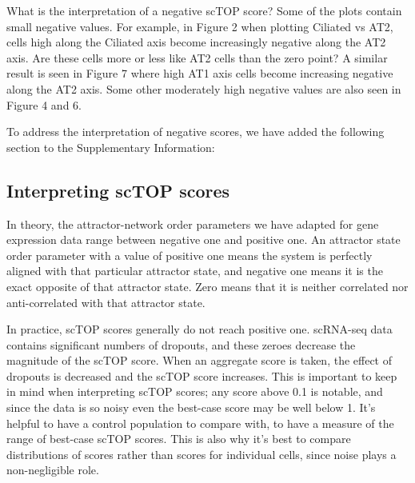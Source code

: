 \documentclass[12pt,american]{scrartcl}
\begin{document}
\begin{revcomment}
    What is the interpretation of a negative scTOP score? Some of the plots contain small negative values. For example, in Figure 2 when plotting Ciliated vs AT2, cells high along the Ciliated axis become increasingly negative along the AT2 axis. Are these cells more or less like AT2 cells than the zero point? A similar result is seen in Figure 7 where high AT1 axis cells become increasing negative along the AT2 axis. Some other moderately high negative values are also seen in Figure 4 and 6.
\end{revcomment}
\begin{revresponse}
    To address the interpretation of negative scores, we have added the following section to the Supplementary Information:
    \begin{changes}
        \subsection*{Interpreting scTOP scores}
        In theory, the attractor-network order parameters we have adapted for gene expression data range between negative one and positive one. An attractor state order parameter with a value of positive one means the system is perfectly aligned with that particular attractor state, and negative one means it is the exact opposite of that attractor state. Zero means that it is neither correlated nor anti-correlated with that attractor state. 
        
        In practice, scTOP scores generally do not reach positive one. scRNA-seq data contains significant numbers of dropouts, and these zeroes decrease the magnitude of the scTOP score. When an aggregate score is taken, the effect of dropouts is decreased and the scTOP score increases. This is important to keep in mind when interpreting scTOP scores; any score above 0.1 is notable, and since the data is so noisy even the best-case score may be well below 1. It's helpful to have a control population to compare with, to have a measure of the range of best-case scTOP scores. This is also why it's best to compare distributions of scores rather than scores for individual cells, since noise plays a non-negligible role.
        

\end{changes}
\end{revresponse}
\end{document}
